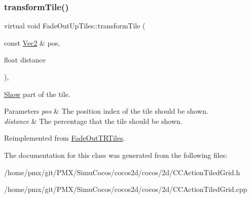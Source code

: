 \subsubsection{\texorpdfstring{transform\+Tile()}{transformTile()}\hspace{0.1cm}{\footnotesize\ttfamily [2/2]}}
{\footnotesize\ttfamily virtual void Fade\+Out\+Up\+Tiles\+::transform\+Tile (\begin{DoxyParamCaption}\item[{const \hyperlink{classVec2}{Vec2} \&}]{pos,  }\item[{float}]{distance }\end{DoxyParamCaption})\hspace{0.3cm}{\ttfamily [override]}, {\ttfamily [virtual]}}



\hyperlink{classShow}{Show} part of the tile. 


\begin{DoxyParams}{Parameters}
{\em pos} & The position index of the tile should be shown. \\
\hline
{\em distance} & The percentage that the tile should be shown. \\
\hline
\end{DoxyParams}


Reimplemented from \hyperlink{classFadeOutTRTiles_affe9ea8485d27ecab09eb0e9ee5d0129}{Fade\+Out\+T\+R\+Tiles}.



The documentation for this class was generated from the following files\+:\begin{DoxyCompactItemize}
\item 
/home/pmx/git/\+P\+M\+X/\+Simu\+Cocos/cocos2d/cocos/2d/C\+C\+Action\+Tiled\+Grid.\+h\item 
/home/pmx/git/\+P\+M\+X/\+Simu\+Cocos/cocos2d/cocos/2d/C\+C\+Action\+Tiled\+Grid.\+cpp\end{DoxyCompactItemize}
